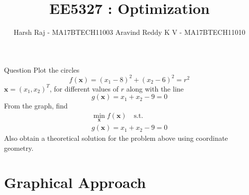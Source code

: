 \documentclass[10pt]{beamer}
\title{EE5327 : Optimization}
\date{}
\author{Harsh Raj - MA17BTECH11003 \newline Aravind Reddy K V - MA17BTECH11010}
\institute{Mathematics and Computing, IIT-Hyderabad}
\begin{document}
\maketitle

\begin{frame}[fragile]{Question}
  Plot the circles 
%
\begin{equation}
\label{eq2_1_circ}
f(\textbf{x}) = (x_1-8)^2 + (x_2-6)^2 = r^2
\end{equation}
%
 $\textbf{x}= (x_1,x_2)^{T}$, for different values of $r$ along with the line 
%
\begin{equation}
\label{eq2_1_line}
g(\textbf{x}) = x_1 + x_2 - 9 = 0
\end{equation} 
%
From the graph, find
\begin{gather*} 
  \min_{\textbf{x}}  f(\textbf{x}) \quad \text{s.t.} \\
  g(\textbf{x}) = x_1 + x_2 - 9 = 0
\end{gather*} 
Also obtain a theoretical solution for the problem above using coordinate geometry.
\end{frame}

\section{Graphical Approach}
\end{document}
